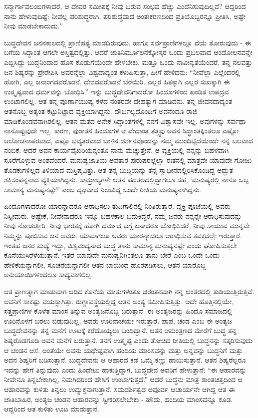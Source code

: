 ಸನ್ಮಾರ್ಗಾವಲಂಬಿಗಳಾದರೆ, ಆ ದೇವರ ಸಮೀಪಕ್ಕೆ ನೀವು ಬರುವ ಸಂಭವ ಹೆಚ್ಚು ಎಂದೆನಿಸುವುದಿಲ್ಲವೆ? ಆದ್ದರಿಂದ ನಾನು ಹೇಳುವುದಿಷ್ಟೆ: ನೀವೆಲ್ಲ ಪರಿಶುದ್ಧರಾಗಿ, ಪರಿಶುದ್ಧವಾದ ಅಂತಃಕರಣದಿಂದ ಪ್ರತಿಯೊಬ್ಬರನ್ನೂ ಪ್ರೀತಿಸಿ, ಅಷ್ಟೇ ನೀವು ಮಾಡಬೇಕಾದುದು."

ಬುದ್ಧದೇವನ ಜನನಕಾಲದಲ್ಲಿ ಪ್ರಾಣಿಹತ್ಯೆ ಮಾಡದಿರುವುದು, ಹಾಗೂ ಸರ್ವಪ್ರಾಣಿಗಳಲ್ಲೂ ದಯೆ ತೋರುವುದು - ಈ ಬಗೆಯ ಸಿದ್ಧಾಂತ ಆಗಲೇ ಅಸ್ತಿತ್ವದಲ್ಲಿತ್ತು. ಆದರೆ ಜಾತಿನಿರ್ಮೂಲನಕ್ಕೋಸ್ಕರ ಒಂದು ಪ್ರಬಲವಾದ ಆಂದೋಲನವನ್ನೇ ಎಬ್ಬಿಸಿದ್ದು ಬುದ್ಧನಿಂದಾದ ಹೊಸ ಕೊಡುಗೆಯೆಂದೇ ಹೇಳಬೇಕು. ಮತ್ತೂ ಒಂದು ನಾವೀನ್ಯತೆಯೆಂದರೆ, ತನ್ನ ನಲವತ್ತು ಜನ ಶಿಷ್ಯರನ್ನು ಪ್ರೇರೇಪಿಸಿ ಅವರನ್ನೆಲ್ಲಾ ವಿಶ್ವದಾದ್ಯಂತ ಕಳುಹಿಸುತ್ತಾ, ಹೀಗೆ ಹೇಳಿದನು: “ನೀವೆಲ್ಲಾ ಎಲ್ಲೆಂದರಲ್ಲಿ ಹೋಗಿ, ಎಲ್ಲ ಜನಾಂಗದವರೊಡನೆ, ದೇಶದವರೊಡನೆ ಬೆರೆಯಿರಿ. ಎಲ್ಲರ ಹಿತಕ್ಕಾಗಿ ಎಲ್ಲರ ಸುಖಕ್ಕಾಗಿ ಈ ಉತ್ಕೃಷ್ಟವಾದ ಧರ್ಮವನ್ನು ಬೋಧಿಸಿ.” ಇನ್ನು ಬುದ್ಧದೇವನಿಗಾದರೋ ಹಿಂದೂಗಳಿಂದ ಖಂಡಿತ ಉಪದ್ರವ ಉಂಟಾಗಲಿಲ್ಲ. ಆತ ತನ್ನ ಪೂರ್ಣಾಯುಷ್ಯ ಕಳೆದ ನಂತರವೇ ದೇಹತ್ಯಾಗ ಮಾಡಿದನು. ತನ್ನ ಜೀವನದಾದ್ಯಂತ ಆತನೊಬ್ಬ ಅತ್ಯಂತ ಕಟ್ಟುನಿಟ್ಟಾದ ವ್ಯಕ್ತಿಯಾಗಿದ್ದನು. ದೌರ್ಬಲ್ಯದೊಂದಿಗೆ ಅವನೆಂದೂ ರಾಜಿ ಮಾಡಿಕೊಂಡವನಾಗಿರಲಿಲ್ಲ. ಆತನ ಮತದ ಅನೇಕ ಸಿದ್ಧಾಂತಗಳಲ್ಲಿ ನನಗೆ ವಿಶ್ವಾಸವೇ ಇಲ್ಲ. ಅವುಗಳನ್ನು ಸರ್ವಥಾ ನಾನೊಪ್ಪುವುದೇ ಇಲ್ಲ. ಕಾರಣ, ಪುರಾತನ ಹಿಂದೂಗಳ ಆ ವೇದಾಂತ ತತ್ತ್ವವು ಅವನ ಸಿದ್ಧಾಂತಕ್ಕಿಂತಲೂ ಎಷ್ಟೋ ಆಲೋಚನಾಪರವಾದ, ಎಷ್ಟೊ ಭವ್ಯತರವಾದ ಬಾಳಿನ ದರ್ಶನವೊಂದನ್ನು ನಮ್ಮ ಮುಂದಿಟ್ಟಿದೆಯೆಂದೇ ನನ್ನ ಬಲವಾದ ನಂಬಿಕೆ. ಆದರೆ ಅವನ ಕಾರ್ಯವೈಖರಿಯನ್ನಂತೂ ನಾನು ಮೆಚ್ಚುತ್ತೇನೆ. ಆ ವ್ಯಕ್ತಿಯಲ್ಲಿ ನನ್ನನ್ನು ಬಹಳವಾಗಿ ಸೂರೆಗೊಳ್ಳುವ ಅಂಶವೆಂದರೆ, ಮನುಷ್ಯಜಾತಿಯ ಅವತಾರ ಪುರುಷರಲ್ಲೆಲ್ಲಾ ಈತನಲ್ಲಿ ಮಾತ್ರವೇ ಯಾವುದೇ ಗೋಜು ತೊಡಕುಗಳಿಲ್ಲದ ತಿಳಿಯಾದ ಮಸ್ತಿಷ್ಕವಿತ್ತು. ಆತ ತನ್ನ ಬುದ್ಧಿಯನ್ನು ತನ್ನ ಸ್ವಾಧೀನದಲ್ಲಿರಿಸಿಕೊಂಡಿದ್ದ ಅದ್ಭುತ ಶಕ್ತಿಸಂಪನ್ನನಾದ ವ್ಯಕ್ತಿಯಾಗಿದ್ದನು. ಸಾಮ್ರಾಜ್ಯಗಳೇ ಆತನ ಪದತಲದಲ್ಲಿದ್ದಾಗಲೂ ಸಹ, ‘ಮನುಷ್ಯರಲ್ಲಿ ನಾನೂ ಒಬ್ಬ ಸಾಮಾನ್ಯ ಮನುಷ್ಯನಷ್ಟೇ!’ ಎಂಬ ದೃಢವಾದ ನಿಲುವಿದ್ದ ಒಂದೇ ರೀತಿಯ ಮನುಷ್ಯನಾಗಿದ್ದನು.

ಹಿಂದೂಗಳಾದರೋ ಯಾರನ್ನಾದರೂ ಆರಾಧಿಸಲು ತುದಿಗಾಲಿನಲ್ಲಿ ನಿಂತಿರುತ್ತಾರೆ. ವ್ಯಕ್ತಿ-ಪೂಜೆಯಲ್ಲಿ ಅವರು ನಿಸ್ಸೀಮರು. ಅಷ್ಟೇಕೆ, ನೀವೇನಾದರೂ ಇನ್ನೂ ಬಹಳಕಾಲ ಬದುಕಿದ್ದರೆ, ನಮ್ಮ ಜನರು ನನ್ನನ್ನೇ ಆರಾಧಿಸುವುದನ್ನು ನೀವು ನೋಡುತ್ತೀರಿ. ನೀವು ಭಾರತಕ್ಕೆ ಹೋಗಿ ಧರ್ಮದ ಬಗ್ಗೆ ಏನಾದರೂ ಬೋಧಿಸಿದರೆ, ನೀವು ಸಾಯುವ ಮುನ್ನವೇ ನಿಮ್ಮನ್ನು ಪೂಜಿಸುವ ಜನ ಅವರು. ಯಾವಾಗಲೂ ಅವರು ಯಾರನ್ನಾದರೂ ಆರಾಧಿಸುವ ತವಕದಲ್ಲೇ ಇರುತ್ತಾರೆ. ಇಂತಹ ಜನರ ಮಧ್ಯೆ ಇದ್ದು, ವಿಶ್ವವಂದ್ಯನಾದ ಬುದ್ಧ ತಾನು ಸಾಮಾನ್ಯ ಮನುಷ್ಯನಷ್ಟೇ ಎಂದು ಘೋಷಿಸುತ್ತಲೇ ಕೊನೆಯುಸಿರೆಳೆಯುತ್ತಾನೆ. ಇತರೆ ಯಾವುದೇ ಮನುಷ್ಯನಿಗಿಂತಲೂ ತಾನು ಬೇರೆ ಎಂಬ ಒಂದೇ ಒಂದು ಹೇಳಿಕೆಯನ್ನಾಗಲೀ, ಸೂಚನೆಯನ್ನಾಗಲೀ ಆತನ ಬಾಯಿಂದ ಹೊರಪಡಿಸಲು, ಆತನ ಯಾರೊಬ್ಬ ಅನುಯಾಯಿಗಳಿಂದಲೂ ಸಾಧ್ಯವಾಗಲಿಲ್ಲ.

ಆತ ಪ್ರಾಣತ್ಯಾಗ ಮಾಡುವಾಗ ಆಡಿದ ಕೊನೆಯ ಮಾತುಗಳಂತೂ ಚಿರಂತನವಾಗಿ ನನ್ನ ಆಂತರದಲ್ಲಿ ತುಡಿಯುತ್ತಿರುತ್ತಿವೆ. ಅವನಿಗೆ ಸಾಕಷ್ಟು ವಯಸ್ಸಾಗಿತ್ತು. ರುಗ್ಣಾವಸ್ಥೆಯಲ್ಲಿದ್ದ ಆತನ ಅಂತ್ಯ ಸಮೀಪಿಸುತ್ತಿತ್ತು. ಅದೇ ಹೊತ್ತಿನಲ್ಲಿಯೇ, ಸತ್ತಪ್ರಾಣಿಗಳ ಕೊಳೆತ ಮಾಂಸ ತಿನ್ನುವ ಅಂತ್ಯಜನೊಬ್ಬ ಬರುತ್ತಾನೆ. ಈ ಅಂತ್ಯಜರನ್ನು ಹಿಂದೂ ಸಮಾಜದಲ್ಲಿ ಊರಿನೊಳಗೆ ಬರಲು ಬಿಡುವುದಿಲ್ಲ; ಅವರು ಊರಿನಾಚೆಯೇ ಇರುತ್ತಾರೆ. ಪಾಪ, ಚಂಡ ಎಂಬ ಈ ಅಂತ್ಯಜ ಬುದ್ಧದೇವನನ್ನು ತನ್ನ ಮನೆಗೆ ಊಟಕ್ಕೆ ಕರೆದೊಯ್ಯಲು ಬಂದಿದ್ದಾನೆ. ಆತನ ಆಮಂತ್ರಣದ ಮೇರೆಗೆ ಬುದ್ಧ ತನ್ನ ಶಿಷ್ಯರೊಡಗೂಡಿ ಅವನ ಮನೆಗೆ ಬರುತ್ತಾನೆ. ತನಗೆ ಉತ್ಕೃಷ್ಟ ಎಂದು ತೋಚಿದ ರೀತಿಯಲ್ಲಿ ಬುದ್ಧನನ್ನು ಸತ್ಕರಿಸುವುದು ಆ ಚಂಡನ ಆಸೆ. ಅಂತೆಯೇ ಅವನು ಯಥೇಷ್ಟವಾಗಿ ಹಂದಿಯ ಮಾಂಸವನ್ನು ಮತ್ತು ಅನ್ನವನ್ನು ಬುದ್ಧನಿಗೆ ಮತ್ತು ಅವನ ಶಿಷ್ಯರಿಗೆ ಬಡಿಸುತ್ತಾನೆ. ಬುದ್ಧದೇವನು ಆ ಆಹಾರದ ಕಡೆ ಒಮ್ಮೆ ಕಣ್ಣು ಹಾಯಿಸುತ್ತಾನೆ. ಆತನ ಶಿಷ್ಯರೆಲ್ಲರೂ ಇದನ್ನು ಹೇಗೆ ತಿನ್ನುವುದು ಎಂದು ಹಿಂದೇಟು ಹಾಕುತ್ತಿದ್ದಾಗ, ಬುದ್ಧದೇವ ಅವರಿಗೆ ಹೇಳುತ್ತಾನೆ: “ಈ ಆಹಾರವನ್ನು ನೀವೇನೂ ತಿನ್ನಬೇಕಾಗಿಲ್ಲ, ನಿಮಗಿದರಿಂದ ಹೇಸಿಗೆ ಉಂಟಾಗುತ್ತದೆ.” ಆದರೆ ಬುದ್ಧನು ಮಾತ್ರ ಶಾಂತಚಿತ್ತದಿಂದ ಆ ಆಹಾರವನ್ನು ಕುಳಿತು ತಿನ್ನಲು ಉದ್ಯುಕ್ತನಾಗುತ್ತಾನೆ. ಸಮದರ್ಶಿತ್ವದ ಅಪೂರ್ವ ಆಚಾರ್ಯನೇ ಆಗಿದ್ದ ಆತ ಈ ಜಾತಿಬಾಹಿರ, ಅಂತ್ಯಜ ಚಂಡನ ಆಹಾರವನ್ನು ಸ್ವೀಕರಿಸಲೇಬೇಕು - ಹೌದು, ಹಂದಿಯ ಮಾಂಸವನ್ನೂ ಕೂಡ. ಆದ್ದರಿಂದ ಆತ ಕುಳಿತು ಊಟ ಮಾಡುತ್ತಾನೆ.

